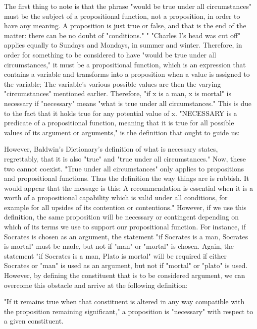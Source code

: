 \documentclass[a4paper,12pt]{book}[2004/02/16]
\theoremstyle{ilemma}
\theoremstyle{itheorem}
\theoremstyle{iother}
\theoremstyle{icorollary}
\theoremstyle{numcorollary}
\theoremstyle{idefinition}
\begin{document}
The first thing to note is that the phrase "would be true under all circumstances" must be the subject of a propositional function, not a proposition, in order to have any meaning. A proposition is just true or false, and that is the end of the matter: there
can be no doubt of "conditions." " "Charles I's head was cut off" applies equally to Sundays and Mondays, in summer and winter. Therefore, in order for something to be considered to have "would be true under all circumstances," it must be a propositional function, which is an expression that contains a variable and transforms into a proposition when a value is assigned to the variable; The variable's various possible values are then the varying "circumstances" mentioned earlier. Therefore, "if x is a man, x is mortal" is necessary if "necessary" means "what is true under all circumstances." This is due to the fact that it holds true for any potential value of x. "NECESSARY is a predicate of a propositional function, meaning that it is true for all possible values of its argument or arguments," is the definition that ought to guide us:

However, Baldwin's Dictionary's definition of what is necessary states, regrettably, that it is also "true" and "true under all circumstances." Now, these two cannot coexist. "True under all circumstances" only applies to propositions and propositional functions. Thus the definition the way things are is rubbish. It would appear that the message is this: A recommendation is essential when it is a worth
of a propositional capability which is valid under all conditions,
for example for all upsides of its contention or contentions." However, if we use this definition, the same proposition will be necessary or contingent depending on which of its terms we use to support our propositional function. For instance, if Socrates is chosen as an argument, the statement "if Socrates is a man, Socrates is mortal" must be made, but not if "man" or "mortal" is chosen. Again, the statement "if Socrates is a man, Plato is mortal" will be required if either Socrates or "man" is used as an argument, but not if "mortal" or "plato" is used. However, by defining the constituent that is to be considered argument, we can overcome this obstacle and arrive at the following definition:

"If it remains true when that constituent is altered in any way compatible with the proposition remaining significant," a proposition is "necessary" with respect to a given constituent.
\end{document}
